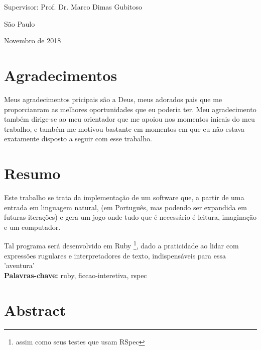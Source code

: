 \documentclass[12pt,twoside,a4paper]{book}
\begin{document}
    \begin{center}
        Supervisor: Prof. Dr. Marco Dimas Gubitoso

        \vskip 5cm
        \normalsize{São Paulo}

        \normalsize{Novembro de 2018}
    \end{center}
    \pagebreak





    \chapter*{Agradecimentos}

    Meus agradecimentos pricipais são a Deus, meus adorados pais que me proporcianram
    as melhores oportunidades que eu poderia ter. Meu agradecimento também dirige-se
    ao meu orientador que me apoiou nos momentos inicais do meu trabalho, e também me
    motivou bastante em momentos em que eu não estava exatamente disposto a seguir
    com esse trabalho.



    \chapter*{Resumo}


    Este trabalho se trata da implementação de um software que, a partir de uma entrada em linguagem
    natural, (em Português, mas podendo ser expandida em futuras iterações) e gera um jogo onde
    tudo que é necessário é leitura, imaginação e um computador.

    Tal programa será desenvolvido em Ruby \footnote{assim como seus testes que usam RSpec}, dado a
    praticidade ao lidar com expressões rugulares e interpretadores de texto, indispensáveis para
    essa 'aventura'
    \\


    \noindent \textbf{Palavras-chave:} ruby, ficcao-interetiva, rspec

    \chapter*{Abstract}
\end{document}
